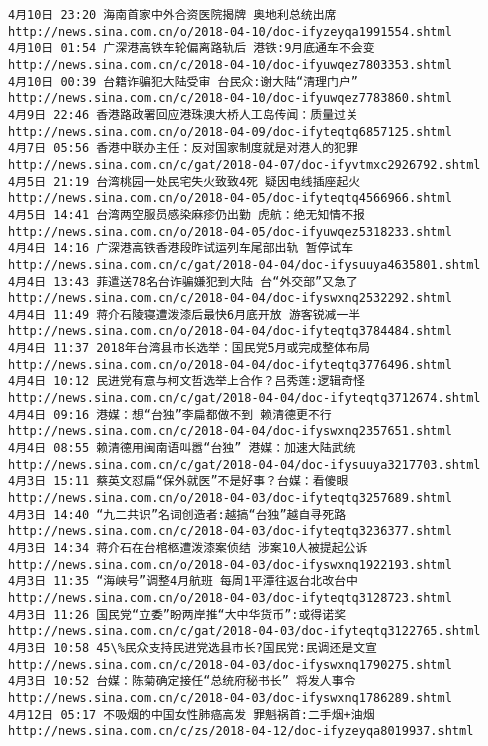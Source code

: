 \documentclass[11pt]{article}
\begin{document}
\begin{Verbatim}[commandchars=\\\{\}]
4月10日 23:20 海南首家中外合资医院揭牌 奥地利总统出席 http://news.sina.com.cn/o/2018-04-10/doc-ifyzeyqa1991554.shtml
4月10日 01:54 广深港高铁车轮偏离路轨后 港铁:9月底通车不会变 http://news.sina.com.cn/c/2018-04-10/doc-ifyuwqez7803353.shtml
4月10日 00:39 台籍诈骗犯大陆受审 台民众:谢大陆“清理门户” http://news.sina.com.cn/c/2018-04-10/doc-ifyuwqez7783860.shtml
4月9日 22:46 香港路政署回应港珠澳大桥人工岛传闻：质量过关 http://news.sina.com.cn/o/2018-04-09/doc-ifyteqtq6857125.shtml
4月7日 05:56 香港中联办主任：反对国家制度就是对港人的犯罪 http://news.sina.com.cn/c/gat/2018-04-07/doc-ifyvtmxc2926792.shtml
4月5日 21:19 台湾桃园一处民宅失火致致4死 疑因电线插座起火 http://news.sina.com.cn/o/2018-04-05/doc-ifyteqtq4566966.shtml
4月5日 14:41 台湾两空服员感染麻疹仍出勤 虎航：绝无知情不报 http://news.sina.com.cn/o/2018-04-05/doc-ifyuwqez5318233.shtml
4月4日 14:16 广深港高铁香港段昨试运列车尾部出轨 暂停试车 http://news.sina.com.cn/c/gat/2018-04-04/doc-ifysuuya4635801.shtml
4月4日 13:43 菲遣送78名台诈骗嫌犯到大陆 台“外交部”又急了 http://news.sina.com.cn/c/2018-04-04/doc-ifyswxnq2532292.shtml
4月4日 11:49 蒋介石陵寝遭泼漆后最快6月底开放 游客锐减一半 http://news.sina.com.cn/o/2018-04-04/doc-ifyteqtq3784484.shtml
4月4日 11:37 2018年台湾县市长选举：国民党5月或完成整体布局 http://news.sina.com.cn/o/2018-04-04/doc-ifyteqtq3776496.shtml
4月4日 10:12 民进党有意与柯文哲选举上合作？吕秀莲:逻辑奇怪 http://news.sina.com.cn/c/gat/2018-04-04/doc-ifyteqtq3712674.shtml
4月4日 09:16 港媒：想“台独”李扁都做不到 赖清德更不行 http://news.sina.com.cn/c/2018-04-04/doc-ifyswxnq2357651.shtml
4月4日 08:55 赖清德用闽南语叫嚣“台独” 港媒：加速大陆武统 http://news.sina.com.cn/c/gat/2018-04-04/doc-ifysuuya3217703.shtml
4月3日 15:11 蔡英文怼扁“保外就医”不是好事？台媒：看傻眼 http://news.sina.com.cn/o/2018-04-03/doc-ifyteqtq3257689.shtml
4月3日 14:40 “九二共识”名词创造者:越搞“台独”越自寻死路 http://news.sina.com.cn/c/2018-04-03/doc-ifyteqtq3236377.shtml
4月3日 14:34 蒋介石在台棺柩遭泼漆案侦结 涉案10人被提起公诉 http://news.sina.com.cn/o/2018-04-03/doc-ifyswxnq1922193.shtml
4月3日 11:35 “海峡号”调整4月航班 每周1平潭往返台北改台中 http://news.sina.com.cn/o/2018-04-03/doc-ifyteqtq3128723.shtml
4月3日 11:26 国民党“立委”盼两岸推“大中华货币”:或得诺奖 http://news.sina.com.cn/c/gat/2018-04-03/doc-ifyteqtq3122765.shtml
4月3日 10:58 45\%民众支持民进党选县市长?国民党:民调还是文宣 http://news.sina.com.cn/c/2018-04-03/doc-ifyswxnq1790275.shtml
4月3日 10:52 台媒：陈菊确定接任“总统府秘书长” 将发人事令 http://news.sina.com.cn/c/2018-04-03/doc-ifyswxnq1786289.shtml
4月12日 05:17 不吸烟的中国女性肺癌高发 罪魁祸首:二手烟+油烟 http://news.sina.com.cn/c/zs/2018-04-12/doc-ifyzeyqa8019937.shtml

\end{Verbatim}
\end{document}
